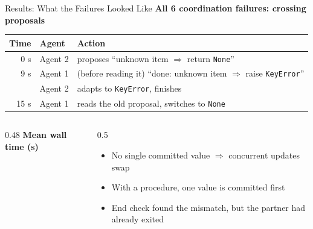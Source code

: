 \documentclass[aspectratio=169,11pt]{beamer}
\begin{document}
\begin{frame}{Results: What the Failures Looked Like}
  \small
  \textbf{All 6 coordination failures: crossing proposals}
  \vspace{0.3em}

  \footnotesize
  \begin{tabular}{rll}
    \toprule
    Time & Agent & Action \\
    \midrule
    0 s & Agent 2 & proposes ``unknown item $\Rightarrow$ return \texttt{None}'' \\
    9 s & Agent 1 & (before reading it) ``done: unknown item $\Rightarrow$ raise \texttt{KeyError}'' \\
     & Agent 2 & adapts to \texttt{KeyError}, finishes \\
    15 s & Agent 1 & reads the old proposal, switches to \texttt{None} \\
    \bottomrule
  \end{tabular}

  \vspace{0.8em}
  \begin{columns}[T]
    \begin{column}{0.48\textwidth}
      \centering\footnotesize\textbf{Mean wall time (s)}\\[2pt]
    \end{column}
    \begin{column}{0.5\textwidth}
      \footnotesize
      \begin{itemize}
        \item No single committed value $\Rightarrow$ concurrent updates swap
        \item With a procedure, one value is committed first
        \item End check found the mismatch, but the partner had already exited
      \end{itemize}
    \end{column}
  \end{columns}
\end{frame}
\end{document}
